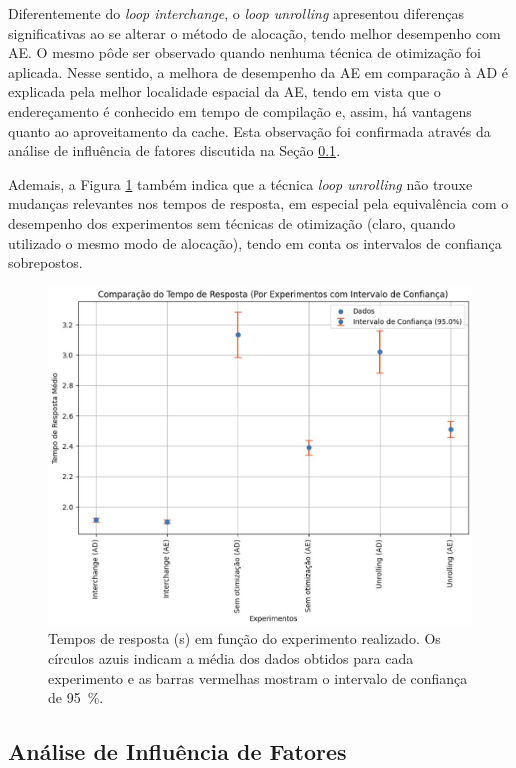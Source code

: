 \documentclass[12pt,a4paper]{article}
\begin{document}
Diferentemente do \textit{loop interchange}, o \textit{loop unrolling} apresentou diferenças significativas ao se alterar o método de alocação, tendo melhor desempenho com AE. O mesmo pôde ser observado quando nenhuma técnica de otimização foi aplicada. Nesse sentido, a melhora de desempenho da AE em comparação à AD é explicada pela melhor localidade espacial da AE, tendo em vista que o endereçamento é conhecido em tempo de compilação e, assim, há vantagens quanto ao aproveitamento da cache. Esta observação foi confirmada através da análise de influência de fatores discutida na Seção \ref{sec:resultados_fatores}.

Ademais, a Figura \ref{fig:tempo_resposta} também indica que a técnica \textit{loop unrolling} não trouxe mudanças relevantes nos tempos de resposta, em especial pela equivalência com o desempenho dos experimentos sem técnicas de otimização (claro, quando utilizado o mesmo modo de alocação), tendo em conta os intervalos de confiança sobrepostos. 

\begin{figure}[H]
\centering
\includegraphics[width=0.90\linewidth]{Figures/fig_tempo_resposta.jpg}
\caption{Tempos de resposta (\si{\second}) em função do experimento realizado. Os círculos azuis indicam a média dos dados obtidos para cada experimento e as barras vermelhas mostram o intervalo de confiança de \SI{95}{\percent}.}
\label{fig:tempo_resposta}
\end{figure}

\subsection{Análise de Influência de Fatores} \label{sec:resultados_fatores}
\end{document}
